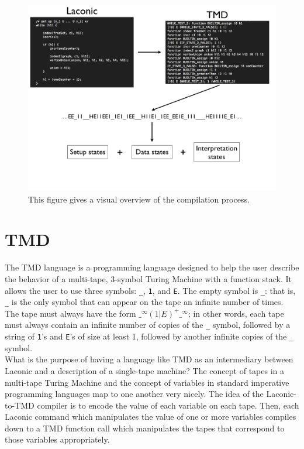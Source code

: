 \documentclass[11pt]{article}
\begin{document}
\begin{figure} 
\begin{center} 
\includegraphics[scale=0.42]{figs/compilation.png}
\caption{This figure gives a visual overview of the compilation process. \label{fig:compilation}} 
\end{center} 
\end{figure}

\section{TMD}

The TMD language is a programming language designed to help the user describe the behavior of a multi-tape, 3-symbol Turing Machine with a function stack. It allows the user to use three symbols: \texttt{\_}, \texttt{1}, and \texttt{E}. The empty symbol is \texttt{\_}: that is, \texttt{\_} is the only symbol that can appear on the tape an infinite number of times. The tape must always have the form $\texttt{\_}^{\infty}(1|E)^+\texttt{\_}^{\infty}$; in other words, each tape must always contain an infinite number of copies of the \texttt{\_} symbol, followed by a string of \texttt{1}'s and \texttt{E}'s of size at least 1, followed by another infinite copies of the \texttt{\_} symbol. \\

What is the purpose of having a language like TMD as an intermediary between Laconic and a description of a single-tape machine? The concept of tapes in a multi-tape Turing Machine and the concept of variables in standard imperative programming languages map to one another very nicely. The idea of the Laconic-to-TMD compiler is to encode the value of each variable on each tape. Then, each Laconic command which manipulates the value of one or more variables compiles down to a TMD function call which manipulates the tapes that correspond to those variables appropriately. \\
\end{document}
